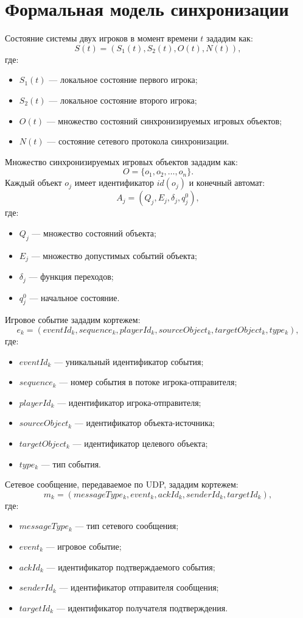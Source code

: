 \section{Формальная модель синхронизации}

Состояние системы двух игроков в момент времени $t$ зададим как:
\[
	S(t) = \left(S_1(t), S_2(t), O(t), N(t)\right),
\]
где:
\begin{itemize}
	\item $S_1(t)$ --- локальное состояние первого игрока;
	\item $S_2(t)$ --- локальное состояние второго игрока;
	\item $O(t)$ --- множество состояний синхронизируемых игровых объектов;
	\item $N(t)$ --- состояние сетевого протокола синхронизации.
\end{itemize}

Множество синхронизируемых игровых объектов зададим как:
\[
	O = \{o_1, o_2, \ldots, o_n\}.
\]
Каждый объект $o_j$ имеет идентификатор $id(o_j)$ и конечный автомат:
\[
	A_j = \left(Q_j, E_j, \delta_j, q_j^0\right),
\]
где:
\begin{itemize}
	\item $Q_j$ --- множество состояний объекта;
	\item $E_j$ --- множество допустимых событий объекта;
	\item $\delta_j$ --- функция переходов;
	\item $q_j^0$ --- начальное состояние.
\end{itemize}

Игровое событие зададим кортежем:
\[
	e_k = \left(eventId_k, sequence_k, playerId_k, sourceObject_k, targetObject_k, type_k\right),
\]
где:
\begin{itemize}
	\item $eventId_k$ --- уникальный идентификатор события;
	\item $sequence_k$ --- номер события в потоке игрока-отправителя;
	\item $playerId_k$ --- идентификатор игрока-отправителя;
	\item $sourceObject_k$ --- идентификатор объекта-источника;
	\item $targetObject_k$ --- идентификатор целевого объекта;
	\item $type_k$ --- тип события.
\end{itemize}

Сетевое сообщение, передаваемое по UDP, зададим кортежем:
\[
	m_k = \left(messageType_k, event_k, ackId_k, senderId_k, targetId_k\right),
\]
где:
\begin{itemize}
	\item $messageType_k$ --- тип сетевого сообщения;
	\item $event_k$ --- игровое событие;
	\item $ackId_k$ --- идентификатор подтверждаемого события;
	\item $senderId_k$ --- идентификатор отправителя сообщения;
	\item $targetId_k$ --- идентификатор получателя подтверждения.
\end{itemize}

